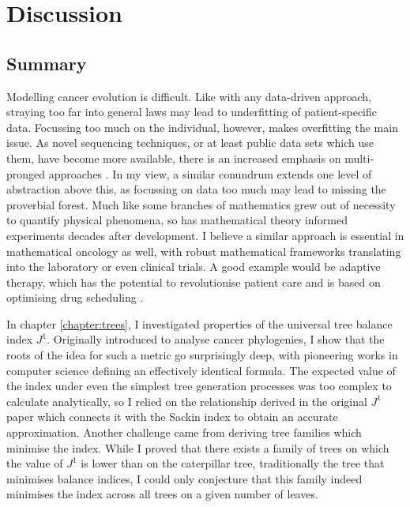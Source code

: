 \chapter{Discussion}\label{chapter:discussion}

\section{Summary}
Modelling cancer evolution is difficult. Like with any data-driven approach,
straying too far into general laws may lead to underfitting of patient-specific
data. Focussing too much on the individual, however, makes overfitting the main
issue. As novel sequencing techniques, or at least public data sets which use
them, have become more available, there is an increased emphasis on
multi-pronged approaches \cite{heide_co-evolution_2022,
househam_phenotypic_2022}. In my view, a similar conundrum extends one level of
abstraction above this, as focussing on data too much may lead to missing the
proverbial forest. Much like some branches of mathematics grew out of necessity
to quantify physical phenomena, so has mathematical theory informed experiments
decades after development. I believe a similar approach is essential in
mathematical oncology as well, with robust mathematical frameworks translating
into the laboratory or even clinical trials. A good example would be adaptive
therapy, which has the potential to revolutionise patient care and is based on
optimising drug scheduling \cite{west_survey_2023}.\par

In chapter \ref{chapter:trees}, I investigated properties of the universal tree
balance index $J^1$. Originally introduced to analyse cancer phylogenies, I
show that the roots of the idea for such a metric go surprisingly deep, with
pioneering works in computer science defining an effectively identical formula.
The expected value of the index under even the simplest tree generation
processes was too complex to calculate analytically, so I relied on the
relationship derived in the original $J^1$ paper \cite{lemant_robust_2022}
which connects it with the Sackin index to obtain an accurate approximation.
Another challenge came from deriving tree families which minimise the index.
While I proved that there exists a family of trees on which the value of $J^1$
is lower than on the caterpillar tree, traditionally the tree that minimises
balance indices, I could only conjecture that this family indeed minimises the
index across all trees on a given number of leaves. \par

